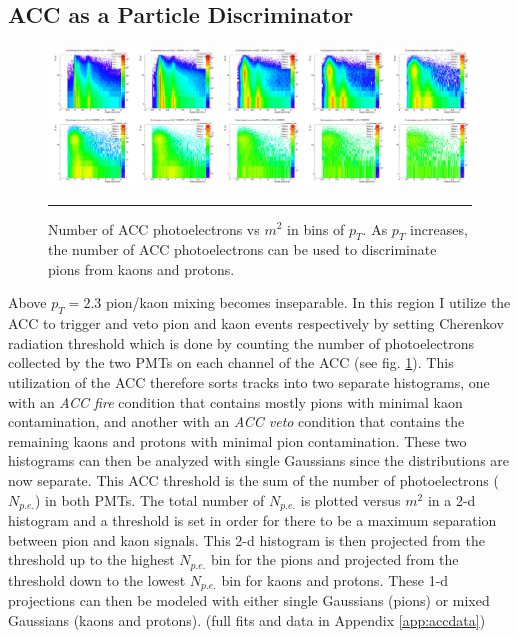 \subsection{ACC as a Particle Discriminator}

\begin{figure}
  \centering
    \includegraphics[width=1.1\textwidth]{hiptfits/nphotvsm2.jpg}
    \rule{35em}{0.5pt}
  \caption[Number of ACC photoelectrons vs $m^2$ in bins of $p_T$.]{Number of ACC photoelectrons vs $m^2$ in bins of $p_T$. As $p_T$ increases, the number of ACC photoelectrons can be used to discriminate pions from kaons and protons.}
  \label{fig:accspread}
\end{figure}

Above $p_T=2.3$ pion/kaon mixing becomes inseparable. In this region I utilize the ACC to trigger and veto pion and kaon events respectively by setting Cherenkov radiation threshold which is done by counting the number of photoelectrons collected by the two PMTs on each channel of the ACC (see fig. \ref{fig:accspread}). This utilization of the ACC therefore sorts tracks into two separate histograms, one with an \textit{ACC fire} condition that contains mostly pions with minimal kaon contamination, and another with an \textit{ACC veto} condition that contains the remaining kaons and protons with minimal pion contamination. These two histograms can then be analyzed with single Gaussians since the distributions are now separate. This ACC threshold is the sum of the number of photoelectrons ($N_{p.e.}$) in both PMTs. The total number of $N_{p.e.}$ is plotted versus $m^2$ in a 2-d histogram and a threshold is set in order for there to be a maximum separation between pion and kaon signals. This 2-d histogram is then projected from the threshold up to the highest $N_{p.e.}$ bin for the pions and projected from the threshold down to the lowest $N_{p.e.}$ bin for kaons and protons. These 1-d projections can then be modeled with either single Gaussians (pions) or mixed Gaussians (kaons and protons). (full fits and data in Appendix \ref{app:accdata})


